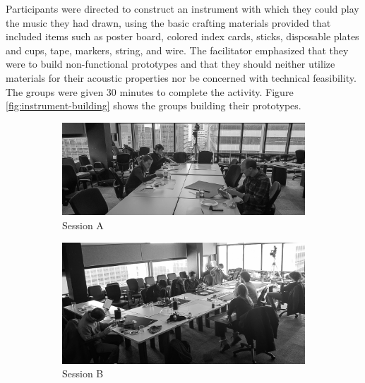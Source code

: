 \documentclass[letterpaper, 12pt]{article}
\begin{document}
Participants were directed to construct an instrument with which they could play the music they had drawn, using the basic crafting materials provided that included items such as poster board, colored index cards, sticks, disposable plates and cups, tape, markers, string, and wire. The facilitator emphasized that they were to build non-functional prototypes and that they should neither utilize materials for their acoustic properties nor be concerned with technical feasibility. The groups were given 30 minutes to complete the activity. Figure \ref{fig:instrument-building} shows the groups building their prototypes.

\begin{figure}[t]
    \centering
    \begin{subfigure}[]{1\textwidth}
        \centering
        \includegraphics[width=1\textwidth]{dfp_nfp_A.jpg}
        \caption{Session A}
        \label{fig:keybox-cad}
    \end{subfigure}
    \par\bigskip
    \begin{subfigure}[]{0.59\textwidth}
        \centering
        \includegraphics[width=1\textwidth]{dfp_nfp_B.jpg}
        \caption{Session B}
        \label{fig:stringbox-cad}
    \end{subfigure}
    \begin{subfigure}[]{0.4\textwidth}
        \centering

\end{subfigure}
\end{figure}
\end{document}
